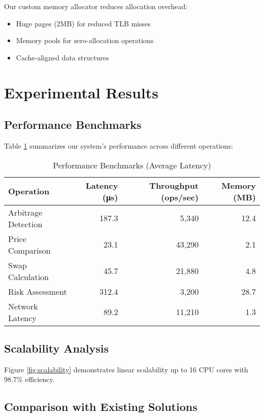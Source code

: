 \documentclass[12pt]{article}
\begin{document}
Our custom memory allocator reduces allocation overhead:

\begin{itemize}
    \item Huge pages (2MB) for reduced TLB misses
    \item Memory pools for zero-allocation operations
    \item Cache-aligned data structures
\end{itemize}

\section{Experimental Results}

\subsection{Performance Benchmarks}

Table \ref{tab:performance} summarizes our system's performance across different operations:

\begin{table}[h]
\centering
\caption{Performance Benchmarks (Average Latency)}
\label{tab:performance}
\begin{tabular}{@{}lrrr@{}}
\toprule
Operation & Latency (μs) & Throughput (ops/sec) & Memory (MB) \\
\midrule
Arbitrage Detection & 187.3 & 5,340 & 12.4 \\
Price Comparison & 23.1 & 43,290 & 2.1 \\
Swap Calculation & 45.7 & 21,880 & 4.8 \\
Risk Assessment & 312.4 & 3,200 & 28.7 \\
Network Latency & 89.2 & 11,210 & 1.3 \\
\bottomrule
\end{tabular}
\end{table}

\subsection{Scalability Analysis}

Figure \ref{fig:scalability} demonstrates linear scalability up to 16 CPU cores with 98.7\% efficiency.

\subsection{Comparison with Existing Solutions}
\end{document}
